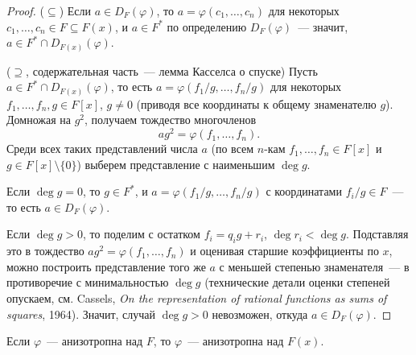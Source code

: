 \documentclass[12pt]{article}
\begin{document}
    \begin{proof}
    	($\subseteq$) Если $a \in D_F(\varphi)$, то $a = \varphi(c_1, \ldots, c_n)$ для некоторых $c_1, \ldots, c_n \in F \subseteq F(x)$, и $a \in F^*$ по определению $D_F(\varphi)$~--- значит, $a \in F^* \cap D_{F(x)}(\varphi)$.
    	
    	($\supseteq$, содержательная часть~--- лемма Касселса о спуске) Пусть $a \in F^* \cap D_{F(x)}(\varphi)$, то есть $a = \varphi(f_1/g, \ldots, f_n/g)$ для некоторых $f_1, \ldots, f_n, g \in F[x]$, $g \neq 0$ (приводя все координаты к общему знаменателю $g$). Домножая на $g^2$, получаем тождество многочленов
    	\[
    	ag^2 = \varphi(f_1, \ldots, f_n).
    	\]
    	Среди всех таких представлений числа $a$ (по всем $n$-кам $f_1, \ldots, f_n \in F[x]$ и $g \in F[x] \setminus \{0\}$) выберем представление с наименьшим $\deg g$.
    	
    	Если $\deg g = 0$, то $g \in F^*$, и $a = \varphi(f_1/g, \ldots, f_n/g)$ с координатами $f_i/g \in F$~--- то есть $a \in D_F(\varphi)$.
    	
    	Если $\deg g > 0$, то поделим с остатком $f_i = q_i g + r_i$, $\deg r_i < \deg g$. Подставляя это в тождество $ag^2 = \varphi(f_1, \ldots, f_n)$ и оценивая старшие коэффициенты по $x$, можно построить представление того же $a$ с меньшей степенью знаменателя~--- в противоречие с минимальностью $\deg g$ (технические детали оценки степеней опускаем, см. Cassels, \emph{On the representation of rational functions as sums of squares}, 1964). Значит, случай $\deg g > 0$ невозможен, откуда $a \in D_F(\varphi)$.
    \end{proof}
    
    \begin{theorem}
    	Если $\varphi$~--- анизотропна над $F$, то $\varphi$~--- анизотропна над $F(x)$.
    \end{theorem}
    
\end{document}
